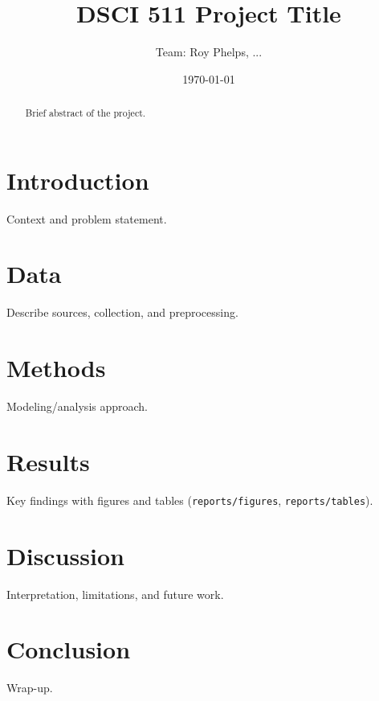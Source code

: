 \documentclass[11pt]{article}
\title{DSCI 511 Project Title}
\author{Team: Roy Phelps, ...}
\date{\today}
\begin{document}
\maketitle

\begin{abstract}
Brief abstract of the project.
\end{abstract}

\section{Introduction}
Context and problem statement.

\section{Data}
Describe sources, collection, and preprocessing.

\section{Methods}
Modeling/analysis approach.

\section{Results}
Key findings with figures and tables (\texttt{reports/figures}, \texttt{reports/tables}).

\section{Discussion}
Interpretation, limitations, and future work.

\section{Conclusion}
Wrap-up.



\end{document}
